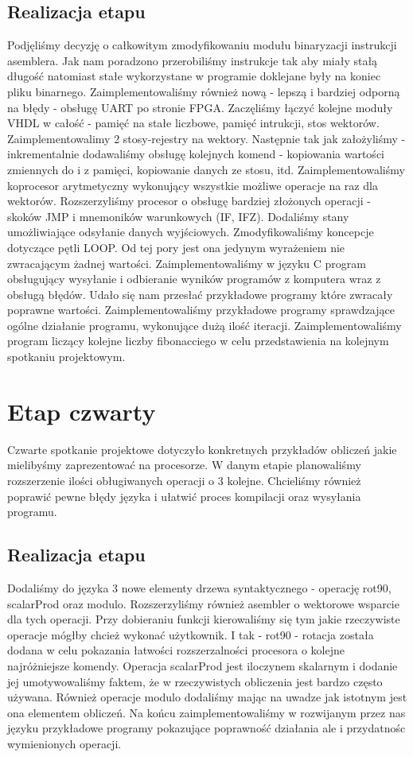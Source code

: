 \subsection{Realizacja etapu}
Podjęliśmy decyzję o całkowitym zmodyfikowaniu modułu binaryzacji instrukcji asemblera. Jak nam poradzono przerobiliśmy instrukcje tak aby miały stałą długość natomiast stałe wykorzystane w programie doklejane były na koniec pliku binarnego. Zaimplementowaliśmy również nową - lepszą i bardziej odporną na błędy -  obsługę UART po stronie FPGA. Zaczęliśmy łączyć kolejne moduły VHDL w całość - pamięć na stałe liczbowe, pamięć intrukcji, stos wektorów. Zaimplementowalimy 2 stosy-rejestry na wektory. Następnie tak jak założyliśmy - inkrementalnie dodawaliśmy obsługę kolejnych komend - kopiowania wartości zmiennych do i z pamięci, kopiowanie danych ze stosu, itd. Zaimplementowaliśmy koprocesor arytmetyczny wykonujący wszystkie możliwe operacje na raz dla wektorów. Rozszerzyliśmy procesor o obsługę bardziej złożonych operacji - skoków JMP i mnemoników warunkowych (IF, IFZ). Dodaliśmy stany umożliwiające odsyłanie danych wyjściowych. Zmodyfikowaliśmy koncepcje dotyczące pętli LOOP. Od tej pory jest ona jedynym wyrażeniem nie zwracającym żadnej wartości. Zaimplementowaliśmy w języku C program obsługujący wysyłanie i odbieranie wyników programów z komputera wraz z obsługą błędów. Udało się nam przesłać przykładowe programy które zwracały poprawne wartości. Zaimplementowaliśmy przykładowe programy sprawdzające ogólne działanie programu, wykonujące dużą ilość iteracji. Zaimplementowaliśmy program liczący kolejne liczby fibonacciego w celu przedstawienia na kolejnym spotkaniu projektowym.
\section{Etap czwarty}
Czwarte spotkanie projektowe dotyczyło konkretnych przykładów obliczeń jakie mielibyśmy zaprezentować na procesorze. W danym etapie planowaliśmy rozszerzenie ilości obługiwanych operacji o 3 kolejne. Chcieliśmy również poprawić pewne błędy języka i ułatwić proces kompilacji oraz wysyłania programu. 
\subsection{Realizacja etapu}
Dodaliśmy do języka 3 nowe elementy drzewa syntaktycznego - operację rot90, scalarProd oraz modulo. Rozszerzyliśmy również asembler o wektorowe wsparcie dla tych operacji. Przy dobieraniu funkcji kierowaliśmy się tym jakie rzeczywiste operacje mógłby chcież wykonać użytkownik. I tak - rot90 - rotacja została dodana w celu pokazania łatwości rozszerzalności procesora o kolejne najróżniejsze komendy. Operacja scalarProd jest iloczynem skalarnym i dodanie jej umotywowaliśmy faktem, że w rzeczywistych obliczenia jest bardzo często używana. Również operacje modulo dodaliśmy mając na uwadze jak istotnym jest ona elementem obliczeń. Na końcu zaimplementowaliśmy w rozwijanym przez nas języku przykładowe programy pokazujące poprawność działania ale i przydatnośc wymienionych operacji.